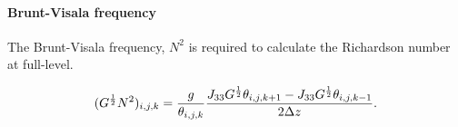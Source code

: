 \paragraph{Brunt-Visala frequency}
The Brunt-Visala frequency, $N^2$ is required to calculate the Richardson number
at full-level.

\begin{equation}
  (G^{\frac{1}{2}}N^2)_{i,j,k} = \frac{g}{\theta_{i,j,k}}
  \frac{J_{33}G^{\frac{1}{2}}\theta_{i,j,k+1}-J_{33}G^{\frac{1}{2}}\theta_{i,j,k-1}}{2\Delta z}.
\end{equation}



%
